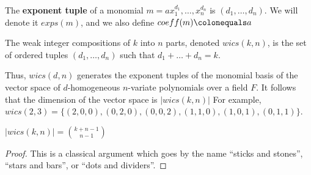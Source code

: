 \begin{defn}
    The \textbf{exponent tuple} of a monomial $m = ax_{1}^{d_1}, \dots, x_{n}^{d_n}$ is $(d_1, \dots, d_n)$. 
	We will denote it $exps(m)$, and we also define $coeff(m) \colonequals a$
\end{defn}




\begin{defn}
    The weak integer compositions of $k$ into $n$ parts, denoted $wics(k, n)$, is the set of ordered tuples 
	\((d_{1}, \ldots, d_{n})\) such that \(d_{1} + \ldots + d_{n} = k\).
\end{defn}

Thus, $wics(d, n)$ generates the exponent tuples of the monomial basis of the vector space of $d$-homogeneous $n$-variate polynomials over a field $F$.
It follows that the dimension of the vector space is $|wics(k, n)|$
For example, %
$wics(2, 3) = \lbrace (2, 0, 0), (0, 2, 0), (0, 0, 2), (1, 1, 0), (1, 0, 1), (0, 1, 1) \rbrace$.
\begin{lem}
    \label{lem:wics:size}
    $|wics(k, n)| = \binom{k + n - 1}{n - 1}$
\end{lem}

\begin{proof}
	This is a classical argument which goes by the name ``sticks and stones'', ``stars and bars'', or ``dots and dividers''.
\end{proof}

